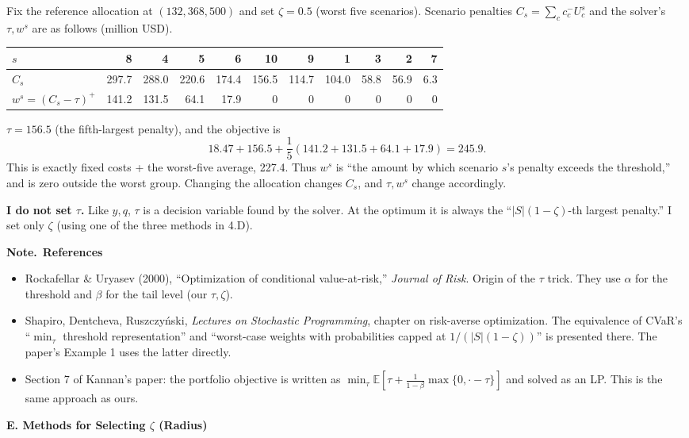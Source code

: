 \documentclass[10pt,a4paper]{article}
\newcommand{\note}{\textbf{Note.}\ }
\begin{document}
Fix the reference allocation at $(132,368,500)$ and set $\zeta=0.5$ (worst five scenarios). Scenario penalties $C_s=\sum_cc_c^-U_c^s$ and the solver's $\tau,w^s$ are as follows (million USD).
{\footnotesize
\begin{center}
\begin{tabular}{@{}lrrrrrrrrrr@{}}
\toprule
$s$ & 8 & 4 & 5 & 6 & 10 & 9 & 1 & 3 & 2 & 7\\\midrule
$C_s$ & 297.7 & 288.0 & 220.6 & 174.4 & 156.5 & 114.7 & 104.0 & 58.8 & 56.9 & 6.3\\
$w^s=(C_s-\tau)^+$ & 141.2 & 131.5 & 64.1 & 17.9 & 0 & 0 & 0 & 0 & 0 & 0\\
\bottomrule
\end{tabular}
\end{center}}
$\tau=156.5$ (the fifth-largest penalty), and the objective is
\[
18.47+156.5+\frac15(141.2+131.5+64.1+17.9)=245.9.
\]
This is exactly fixed costs + the worst-five average, 227.4. Thus $w^s$ is ``the amount by which scenario $s$'s penalty exceeds the threshold,'' and is zero outside the worst group. Changing the allocation changes $C_s$, and $\tau,w^s$ change accordingly.

\textbf{I do not set $\tau$.} Like $y,q$, $\tau$ is a decision variable found by the solver. At the optimum it is always the ``$|S|(1-\zeta)$-th largest penalty.'' I set only $\zeta$ (using one of the three methods in 4.D).

\note \textbf{References}
\begin{itemize}
\item Rockafellar \& Uryasev (2000), ``Optimization of conditional value-at-risk,'' \emph{Journal of Risk}. Origin of the $\tau$ trick. They use $\alpha$ for the threshold and $\beta$ for the tail level (our $\tau,\zeta$).
\item Shapiro, Dentcheva, Ruszczy\'{n}ski, \emph{Lectures on Stochastic Programming}, chapter on risk-averse optimization. The equivalence of CVaR's ``$\min_\tau$ threshold representation'' and ``worst-case weights with probabilities capped at $1/(|S|(1-\zeta))$'' is presented there. The paper's Example 1 uses the latter directly.
\item Section 7 of Kannan's paper: the portfolio objective is written as $\min_\tau\mathbb E[\tau+\frac1{1-\beta}\max\{0,\cdot-\tau\}]$ and solved as an LP. This is the same approach as ours.
\end{itemize}

\textbf{E. Methods for Selecting $\zeta$ (Radius)}
\end{document}
